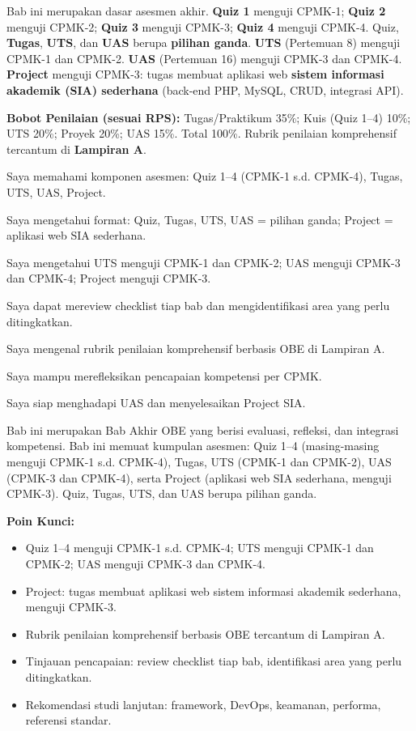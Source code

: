 \documentclass[../main.tex]{subfiles}
\begin{document}
\begin{asesmen}
Bab ini merupakan dasar asesmen akhir. \textbf{Quiz 1} menguji CPMK-1; \textbf{Quiz 2} menguji CPMK-2; \textbf{Quiz 3} menguji CPMK-3; \textbf{Quiz 4} menguji CPMK-4. Quiz, \textbf{Tugas}, \textbf{UTS}, dan \textbf{UAS} berupa \textbf{pilihan ganda}. \textbf{UTS} (Pertemuan 8) menguji CPMK-1 dan CPMK-2. \textbf{UAS} (Pertemuan 16) menguji CPMK-3 dan CPMK-4. \textbf{Project} menguji CPMK-3: tugas membuat aplikasi web \textbf{sistem informasi akademik (SIA) sederhana} (back-end PHP, MySQL, CRUD, integrasi API).

\textbf{Bobot Penilaian (sesuai RPS):} Tugas/Praktikum 35\%; Kuis (Quiz 1--4) 10\%; UTS 20\%; Proyek 20\%; UAS 15\%. Total 100\%. Rubrik penilaian komprehensif tercantum di \textbf{Lampiran A}.
\end{asesmen}

\begin{checklist}
  \item Saya memahami komponen asesmen: Quiz 1--4 (CPMK-1 s.d. CPMK-4), Tugas, UTS, UAS, Project.
  \item Saya mengetahui format: Quiz, Tugas, UTS, UAS = pilihan ganda; Project = aplikasi web SIA sederhana.
  \item Saya mengetahui UTS menguji CPMK-1 dan CPMK-2; UAS menguji CPMK-3 dan CPMK-4; Project menguji CPMK-3.
  \item Saya dapat mereview checklist tiap bab dan mengidentifikasi area yang perlu ditingkatkan.
  \item Saya mengenal rubrik penilaian komprehensif berbasis OBE di Lampiran A.
  \item Saya mampu merefleksikan pencapaian kompetensi per CPMK.
  \item Saya siap menghadapi UAS dan menyelesaikan Project SIA.
\end{checklist}

\begin{rangkuman}
Bab ini merupakan Bab Akhir OBE yang berisi evaluasi, refleksi, dan integrasi kompetensi. Bab ini memuat kumpulan asesmen: Quiz 1--4 (masing-masing menguji CPMK-1 s.d. CPMK-4), Tugas, UTS (CPMK-1 dan CPMK-2), UAS (CPMK-3 dan CPMK-4), serta Project (aplikasi web SIA sederhana, menguji CPMK-3). Quiz, Tugas, UTS, dan UAS berupa pilihan ganda.

\textbf{Poin Kunci:}
\begin{itemize}
  \item Quiz 1--4 menguji CPMK-1 s.d. CPMK-4; UTS menguji CPMK-1 dan CPMK-2; UAS menguji CPMK-3 dan CPMK-4.
  \item Project: tugas membuat aplikasi web sistem informasi akademik sederhana, menguji CPMK-3.
  \item Rubrik penilaian komprehensif berbasis OBE tercantum di Lampiran A.
  \item Tinjauan pencapaian: review checklist tiap bab, identifikasi area yang perlu ditingkatkan.
  \item Rekomendasi studi lanjutan: framework, DevOps, keamanan, performa, referensi standar.
\end{itemize}
\end{rangkuman}

\ifSubfilesClassLoaded{
  \renewcommand{\bibname}{Daftar Pustaka}
  
  
}{}
\end{document}
